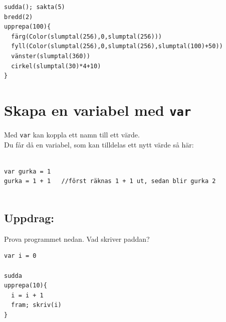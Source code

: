   

\begin{lstlisting}[basicstyle={\ttfamily\fontsize{16}{19}\selectfont},numbers=none]
sudda(); sakta(5)
bredd(2)
upprepa(100){
  färg(Color(slumptal(256),0,slumptal(256)))
  fyll(Color(slumptal(256),0,slumptal(256),slumptal(100)+50))
  vänster(slumptal(360))
  cirkel(slumptal(30)*4+10)
}
\end{lstlisting}
        
\chapter{Skapa en variabel med \lstinline{var}}Med \lstinline{var} kan koppla ett namn till ett värde.\\
Du får då en variabel, som kan tilldelas ett nytt värde så här:

\begin{lstlisting}[numbers=none]

var gurka = 1
gurka = 1 + 1   //först räknas 1 + 1 ut, sedan blir gurka 2        
        
\end{lstlisting}
        
\section*{\color{BrickRed}Uppdrag:}
Prova programmet nedan. Vad skriver paddan?

\begin{lstlisting}[basicstyle={\ttfamily\fontsize{16}{19}\selectfont},numbers=none]
var i = 0

sudda
upprepa(10){
  i = i + 1
  fram; skriv(i)
}
\end{lstlisting}
        
